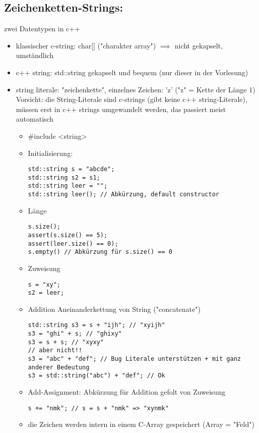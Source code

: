 \documentclass[a4paper]{scrartcl}
\theoremstyle{definition}
\theoremstyle{plain}
\theoremstyle{remark}
\theoremstyle{remark}
\begin{document}
\subsection{Zeichenketten-Strings:}
\label{sec-8-3}
zwei Datentypen in c++
\begin{itemize}
\item klassischer c-string: char[] ("charakter array") $\implies$ nicht gekapselt, umständlich
\item c++ string: std::string gekapselt und bequem (nur dieser in der Vorlesung)
\item string literale: "zeichenkette", einzelnes Zeichen: 'z' ("z" = Kette der Länge 1) \\
     Vorsicht: die String-Literale sind c-strings (gibt keine c++ string-Literale),
müssen erst in c++ strings umgewandelt werden, das passiert meist automatisch
\begin{itemize}
\item \#include <string>
\item Initialisierung:
\begin{verbatim}
std::string s = "abcde";
std::string s2 = s1;
std::string leer = "";
std::string leer(); // Abkürzung, default constructor
\end{verbatim}
\item Länge
\begin{verbatim}
s.size();
assert(s.size() == 5);
assert(leer.size() == 0);
s.empty() // Abkürzung für s.size() == 0
\end{verbatim}
\item Zuweisung
\begin{verbatim}
s = "xy";
s2 = leer;
\end{verbatim}
\item Addition
Aneinanderkettung von String ("concatenate")
\begin{verbatim}
std::string s3 = s + "ijh"; // "xyijh"
s3 = "ghi" + s; // "ghixy"
s3 = s + s; // "xyxy"
// aber nicht!!
s3 = "abc" + "def"; // Bug Literale unterstützen + mit ganz anderer Bedeutung
s3 = std::string("abc") + "def"; // Ok
\end{verbatim}
\item Add-Assignment: Abkürzung für Addition gefolt von Zuweisung
\begin{verbatim}
s += "nmk"; // s = s + "nmk" => "xynmk"
\end{verbatim}
\item die Zeichen werden intern in einem C-Array gespeichert (Array = "Feld") \\

\end{itemize}
\end{itemize}
\end{document}
